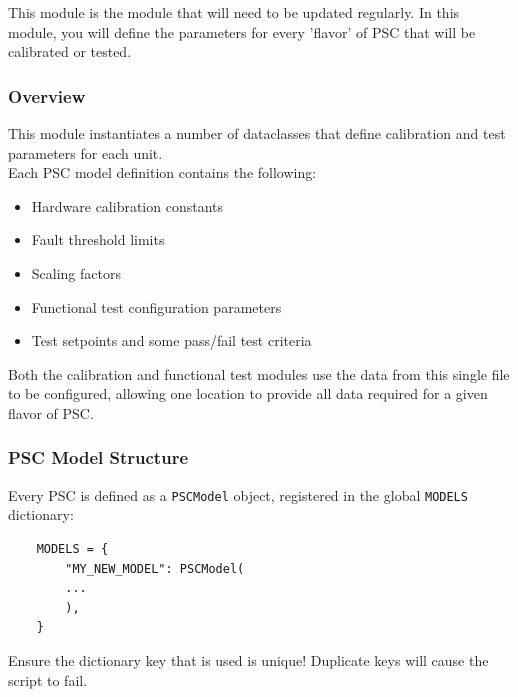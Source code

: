 
This module is the module that will need to be updated regularly. In this module, you will define the parameters for every 'flavor' of PSC that will be calibrated or tested.\\
\subsubsection{Overview}
This module instantiates a number of dataclasses that define calibration and test parameters for each unit.\\
Each PSC model definition contains the following:\\
\begin{itemize}
	\item Hardware calibration constants
	\item Fault threshold limits
	\item Scaling factors
	\item Functional test configuration parameters
	\item Test setpoints and some pass/fail test criteria
\end{itemize}
Both the calibration and functional test modules use the data from this single file to be configured, allowing one location to provide all data required for a given flavor of PSC.\\
\subsubsection{PSC Model Structure}
Every PSC is defined as a \texttt{PSCModel} object, registered in the global \texttt{MODELS} dictionary:
\begin{verbatim}
	MODELS = {
		"MY_NEW_MODEL": PSCModel(
		...
		),
	}
\end{verbatim}
Ensure the dictionary key that is used is unique! Duplicate keys will cause the script to fail. 

